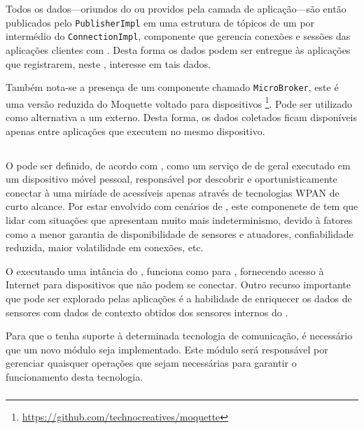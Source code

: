 Todos os dados---oriundos do \stwopa ou providos pela camada de aplicação---são então publicados pelo \texttt{PublisherImpl} em uma estrutura de tópicos de um \broker \mqtt por intermédio do \texttt{ConnectionImpl}, componente que gerencia conexões e sessões das aplicações clientes com \brokers.
Desta forma os dados podem ser entregue às aplicações que registrarem, neste \broker, interesse em tais dados.

Também nota-se a presença de um componente chamado \texttt{MicroBroker}, este é uma versão reduzida do \broker \mqtt Moquette voltado para dispositivos \android\footnote{\url{https://github.com/technocreatives/moquette}}. Pode ser utilizado como alternativa a um \broker externo. Desta forma, os dados coletados ficam disponíveis apenas entre aplicações que executem no mesmo dispositivo.

\subsection{\mhub}

O \middleware \mhub pode ser definido, de acordo com , como um serviço de \middleware de \iomt geral executado em um dispositivo móvel pessoal, responsável por descobrir e oportunisticamente conectar à uma miríade de \smartobjs acessíveis apenas através de tecnologias WPAN de curto alcance. Por estar envolvido com cenários de \iomt, este componenete de \software tem que lidar com situações que apresentam muito mais indeterminismo, devido à fatores como a menor garantia de disponibilidade de sensores e atuadores, confiabilidade reduzida, maior volatilidade em conexões, etc.

O \smartphone executando uma intância do \mhub, funciona como \gateway para \smartobjs, fornecendo acesso à Internet para dispositivos que não podem se conectar. Outro recurso importante que pode ser explorado pelas aplicações é a habilidade de enriquecer os dados de sensores com dados de contexto obtidos dos sensores internos do \mhub.

Para que o \mhub tenha suporte à determinada tecnologia de comunicação, é necessário que um novo módulo seja implementado. Este módulo será responsável por gerenciar quaisquer operações que sejam necessárias para garantir o funcionamento desta tecnologia.

\subsubsection{\stwopa} \label{subsub:s2pa}

